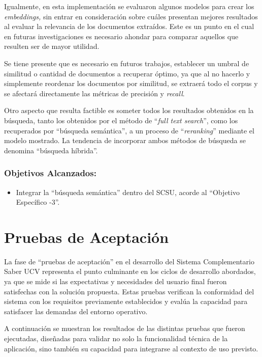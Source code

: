 \documentclass[
  12pt,
  openany]{book}
\providecommand{\tightlist}{%
  \setlength{\itemsep}{0pt}\setlength{\parskip}{0pt}}
\begin{document}
Igualmente, en esta implementación se evaluaron algunos modelos para crear los \emph{embeddings,} sin entrar en consideración sobre cuáles presentan mejores resultados al evaluar la relevancia de los documentos extraídos. Este es un punto en el cual en futuras investigaciones es necesario ahondar para comparar aquellos que resulten ser de mayor utilidad.

Se tiene presente que es necesario en futuros trabajos, establecer un umbral de similitud o cantidad de documentos a recuperar óptimo, ya que al no hacerlo y simplemente reordenar los documentos por similitud, se extraerá todo el corpus y se afectará directamente las métricas de precisión y \emph{recall}.

Otro aspecto que resulta factible es someter todos los resultados obtenidos en la búsqueda, tanto los obtenidos por el método de ``\emph{full text search}'', como los recuperados por ``búsqueda semántica'', a un proceso de ``\emph{reranking}'' mediante el modelo mostrado. La tendencia de incorporar ambos métodos de búsqueda se denomina ``búsqueda híbrida''.

\hypertarget{objetivos-alcanzados-4}{%
\subsubsection{Objetivos Alcanzados:}\label{objetivos-alcanzados-4}}

\begin{itemize}
\tightlist
\item
  Integrar la ``búsqueda semántica'' dentro del SCSU, acorde al ``Objetivo Específico -3''.
\end{itemize}

\newpage

\hypertarget{pruebas}{%
\section{Pruebas de Aceptación}\label{pruebas}}

La fase de ``pruebas de aceptación'' en el desarrollo del Sistema Complementario Saber UCV representa el punto culminante en los ciclos de desarrollo abordados, ya que se mide si las expectativas y necesidades del usuario final fueron satisfechas con la solución propuesta. Estas pruebas verifican la conformidad del sistema con los requisitos previamente establecidos y evalúa la capacidad para satisfacer las demandas del entorno operativo.

A continuación se muestran los resultados de las distintas pruebas que fueron ejecutadas, diseñadas para validar no solo la funcionalidad técnica de la aplicación, sino también su capacidad para integrarse al contexto de uso previsto.
\end{document}
